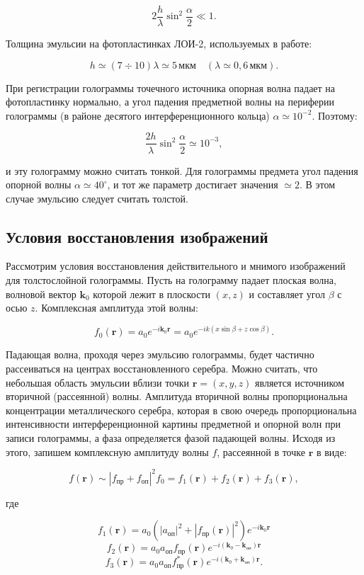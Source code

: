 \documentclass[a4paper,12pt]{article}
\begin{document}
$$
2 \frac{h}{\lambda} \sin^2 \frac{\alpha}{2} \ll 1.
$$

Толщина эмульсии на фотопластинках ЛОИ-2, используемых в работе:

$$
h \simeq (7 \div 10) \lambda \simeq 5 \, \text{мкм} \quad (\lambda \simeq 0,6 \, \text{мкм}).
$$

При регистрации голограммы точечного источника опорная волна падает на фотопластинку нормально, а угол падения предметной волны на периферии голограммы (в районе десятого интерференционного кольца) $\alpha \simeq 10^{-2}$. Поэтому:

$$
\frac{2h}{\lambda} \sin^2 \frac{\alpha}{2} \simeq 10^{-3},
$$

и эту голограмму можно считать тонкой. Для голограммы предмета угол падения опорной волны $\alpha \simeq 40^\circ$, и тот же параметр достигает значения $\simeq 2$. В этом случае эмульсию следует считать толстой.

\subsection{Условия восстановления изображений}
Рассмотрим условия восстановления действительного и мнимого изображений для толстослойной голограммы. Пусть на голограмму падает плоская волна, волновой вектор $\mathbf{k}_0$ которой лежит в плоскости $(x, z)$ и составляет угол $\beta$ с осью $z$. Комплексная амплитуда этой волны:

$$
f_0(\mathbf{r}) = a_0 e^{-i\mathbf{k}_0 \mathbf{r}} = a_0 e^{-ik(x \sin \beta + z \cos \beta)}.
$$

Падающая волна, проходя через эмульсию голограммы, будет частично рассеиваться на центрах восстановленного серебра. Можно считать, что небольшая область эмульсии вблизи точки $\mathbf{r} = (x, y, z)$ является источником вторичной (рассеянной) волны. Амплитуда вторичной волны пропорциональна концентрации металлического серебра, которая в свою очередь пропорциональна интенсивности интерференционной картины предметной и опорной волн при записи голограммы, а фаза определяется фазой падающей волны. Исходя из этого, запишем комплексную амплитуду волны $f$, рассеянной в точке $\mathbf{r}$ в виде:

$$
f(\mathbf{r}) \sim |f_{\text{пр}} + f_{\text{оп}}|^2 f_0 = f_1(\mathbf{r}) + f_2(\mathbf{r}) + f_3(\mathbf{r}),
$$

где

$$
f_1(\mathbf{r}) = a_0 \left( |a_{\text{оп}}|^2 + |f_{\text{пр}}(\mathbf{r})|^2 \right) e^{-i\mathbf{k}_0 \mathbf{r}}
$$
$$
f_2(\mathbf{r}) = a_0 a_{\text{оп}} f_{\text{пр}}(\mathbf{r}) e^{-i(\mathbf{k}_0 - \mathbf{k}_{\text{оп}}) \mathbf{r}}
$$
$$
f_3(\mathbf{r}) = a_0 a_{\text{оп}} f_{\text{пр}}^{*}(\mathbf{r}) e^{-i(\mathbf{k}_0 + \mathbf{k}_{\text{оп}}) \mathbf{r}}.
$$
\end{document}
